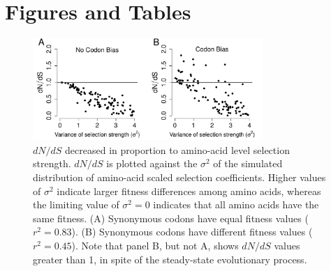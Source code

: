 \documentclass[11pt]{article}
\begin{document}
		

		
		


		
		
	
	
\section*{Figures and Tables}

\vspace{2cm}
	
\begin{figure}[htbp]
	\centerline{\includegraphics[width=8.7cm]{figures/MainText/dnds_variance.pdf}}
	\caption{\label{dnds_variance} $dN/dS$ decreased in proportion to amino-acid level selection strength. $dN/dS$ is plotted against the $\sigma^2 $ of the simulated distribution of amino-acid scaled selection coefficients. Higher values of $\sigma^2$ indicate larger fitness differences among amino acids, whereas the limiting value of $\sigma^2 = 0$ indicates that all amino acids have the same fitness. (A) Synonymous codons have equal fitness values ($r^2=0.83$). (B) Synonymous codons have different fitness values ($r^2=0.45$). Note that panel B, but not A, shows $dN/dS$ values greater than 1, in spite of the steady-state evolutionary process.}
\end{figure}
		
		
\vspace{2cm}
		
\end{document}
